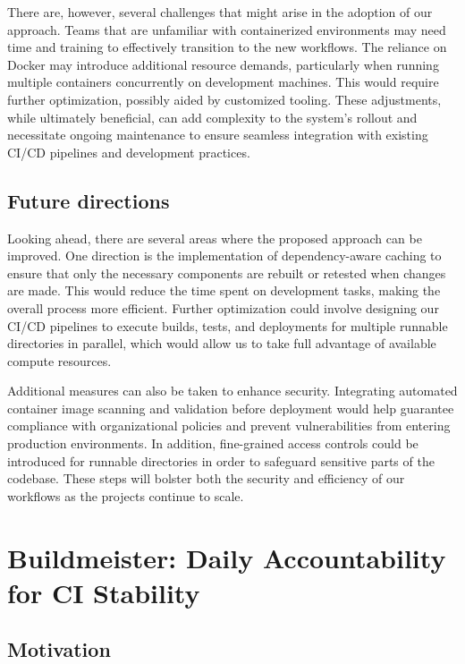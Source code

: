 \documentclass{article}
\begin{document}
There are, however, several challenges that might arise in the adoption of our
approach. Teams that are unfamiliar with containerized environments may need time
and training to effectively transition to the new workflows. The reliance on
Docker may introduce additional resource demands, particularly when running multiple
containers concurrently on development machines. This would require further
optimization, possibly aided by customized tooling. These adjustments, while ultimately
beneficial, can add complexity to the system's rollout and necessitate ongoing
maintenance to ensure seamless integration with existing CI/CD pipelines and
development practices.

\subsection{Future directions}
\label{future-directions}

Looking ahead, there are several areas where the proposed approach can be
improved. One direction is the implementation of dependency-aware caching to ensure
that only the necessary components are rebuilt or retested when changes are made.
This would reduce the time spent on development tasks, making the overall process
more efficient. Further optimization could involve designing our CI/CD pipelines
to execute builds, tests, and deployments for multiple runnable directories in
parallel, which would allow us to take full advantage of available compute resources.

Additional measures can also be taken to enhance security. Integrating automated
container image scanning and validation before deployment would help guarantee
compliance with organizational policies and prevent vulnerabilities from
entering production environments. In addition, fine-grained access controls
could be introduced for runnable directories in order to safeguard sensitive
parts of the codebase. These steps will bolster both the security and efficiency
of our workflows as the projects continue to scale.

\section{Buildmeister: Daily Accountability for CI Stability}
\label{buildmeister-daily-accountability-for-ci-stability}

\subsection{Motivation}
\label{motivation}
\end{document}
